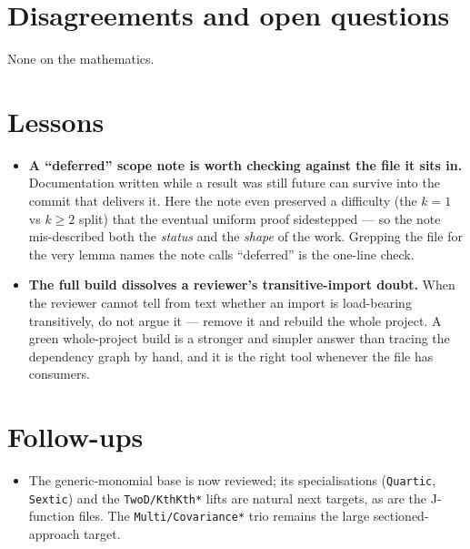 \documentclass[11pt]{article}
\begin{document}
\section{Disagreements and open questions}
None on the mathematics.

\section{Lessons}
\begin{itemize}[noitemsep]
  \item \textbf{A ``deferred'' scope note is worth checking against the file it sits in.} Documentation written
    while a result was still future can survive into the commit that delivers it. Here the note even preserved
    a difficulty (the $k=1$ vs $k\ge2$ split) that the eventual uniform proof sidestepped --- so the note
    mis-described both the \emph{status} and the \emph{shape} of the work. Grepping the file for the very
    lemma names the note calls ``deferred'' is the one-line check.
  \item \textbf{The full build dissolves a reviewer's transitive-import doubt.} When the reviewer cannot tell
    from text whether an import is load-bearing transitively, do not argue it --- remove it and rebuild the
    whole project. A green whole-project build is a stronger and simpler answer than tracing the dependency
    graph by hand, and it is the right tool whenever the file has consumers.
\end{itemize}

\section{Follow-ups}
\begin{itemize}[noitemsep]
  \item The generic-monomial base is now reviewed; its specialisations (\texttt{Quartic}, \texttt{Sextic}) and
    the \texttt{TwoD/KthKth*} lifts are natural next targets, as are the J-function files. The
    \texttt{Multi/Covariance*} trio remains the large sectioned-approach target.
\end{itemize}
\end{document}
